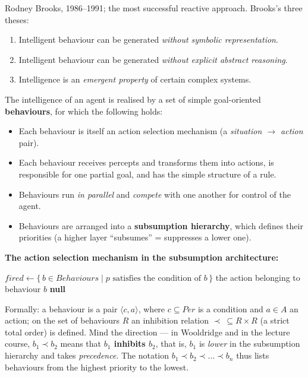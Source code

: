 \documentclass[11pt,a4paper]{article}
\theoremstyle{definition}
\providecommand{\uv}[1]{``#1''}
\begin{document}
\begin{defbox}
Rodney Brooks, 1986--1991; the most successful reactive approach. Brooks's three theses:
\begin{enumerate}
\item Intelligent behaviour can be generated \emph{without symbolic representation}.
\item Intelligent behaviour can be generated \emph{without explicit abstract reasoning}.
\item Intelligence is an \emph{emergent property} of certain complex systems.
\end{enumerate}

The intelligence of an agent is realised by a set of simple goal-oriented \textbf{behaviours}, for
which the following holds:
\begin{itemize}
\item Each behaviour is itself an action selection mechanism (a \emph{situation $\to$ action} pair).
\item Each behaviour receives percepts and transforms them into actions, is responsible for one
  partial goal, and has the simple structure of a rule.
\item Behaviours run \emph{in parallel} and \emph{compete} with one another for control of the agent.
\item Behaviours are arranged into a \textbf{subsumption hierarchy}, which defines their priorities
  (a higher layer \uv{subsumes} = suppresses a lower one).
\end{itemize}
\end{defbox}

\noindent\textbf{The action selection mechanism in the subsumption architecture:}
\begin{algorithmic}[1]
  \State $\mathit{fired} \gets \{\, b \in \mathit{Behaviours} \mid p \text{ satisfies the condition of } b \,\}$
    \Comment{behaviours that \uv{fire}}
      \State \Return the action belonging to behaviour $b$
    \EndIf
  \EndFor
  \State \Return \textbf{null} 
\EndFunction
\end{algorithmic}

Formally: a behaviour is a pair $\langle c, a\rangle$, where $c \subseteq \mathit{Per}$ is a
condition and $a \in A$ an action; on the set of behaviours $R$ an inhibition relation
$\prec\ \subseteq R \times R$ (a strict total order) is defined. Mind the direction ---
in Wooldridge and in the lecture course, $b_1 \prec b_2$ means that \textbf{$b_1$ inhibits $b_2$},
that is, $b_1$ is \emph{lower} in the subsumption hierarchy and takes \emph{precedence}.
The notation $b_1 \prec b_2 \prec \dots \prec b_n$ thus lists behaviours from the highest priority
to the lowest.
\end{document}
